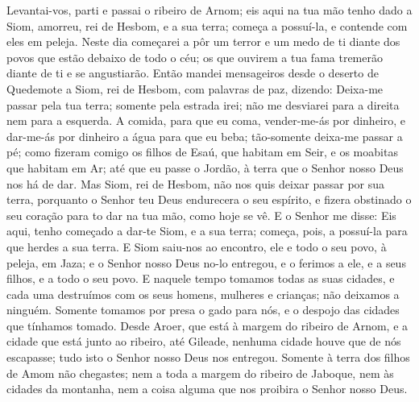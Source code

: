 Levantai-vos, parti e passai o ribeiro de Arnom; eis aqui na tua
mão tenho dado a Siom, amorreu, rei de Hesbom, e a sua terra; começa
a possuí-la, e contende com eles em peleja. Neste dia
começarei a pôr um terror e um medo de ti diante dos povos que estão
debaixo de todo o céu; os que ouvirem a tua fama tremerão diante de
ti e se angustiarão. Então mandei mensageiros desde o deserto
de Quedemote a Siom, rei de Hesbom, com palavras de paz, dizendo:
Deixa-me passar pela tua terra; somente pela estrada irei;
não me desviarei para a direita nem para a esquerda. A
comida, para que eu coma, vender-me-ás por dinheiro, e dar-me-ás por
dinheiro a água para que eu beba; tão-somente deixa-me passar a pé;
como fizeram comigo os filhos de Esaú, que habitam em Seir, e
os moabitas que habitam em Ar; até que eu passe o Jordão, à terra
que o Senhor nosso Deus nos há de dar. Mas Siom, rei de
Hesbom, não nos quis deixar passar por sua terra, porquanto o Senhor
teu Deus endurecera o seu espírito, e fizera obstinado o seu coração
para to dar na tua mão, como hoje se vê. E o Senhor me disse:
Eis aqui, tenho começado a dar-te Siom, e a sua terra; começa, pois,
a possuí-la para que herdes a sua terra. E Siom saiu-nos ao
encontro, ele e todo o seu povo, à peleja, em Jaza; e o
Senhor nosso Deus no-lo entregou, e o ferimos a ele, e a seus
filhos, e a todo o seu povo. E naquele tempo tomamos todas as
suas cidades, e cada uma destruímos com os seus homens, mulheres e
crianças; não deixamos a ninguém. Somente tomamos por presa o
gado para nós, e o despojo das cidades que tínhamos tomado.
Desde Aroer, que está à margem do ribeiro de Arnom, e a
cidade que está junto ao ribeiro, até Gileade, nenhuma cidade houve
que de nós escapasse; tudo isto o Senhor nosso Deus nos entregou.
Somente à terra dos filhos de Amom não chegastes; nem a toda
a margem do ribeiro de Jaboque, nem às cidades da montanha, nem a
coisa alguma que nos proibira o Senhor nosso Deus.

\medskip

